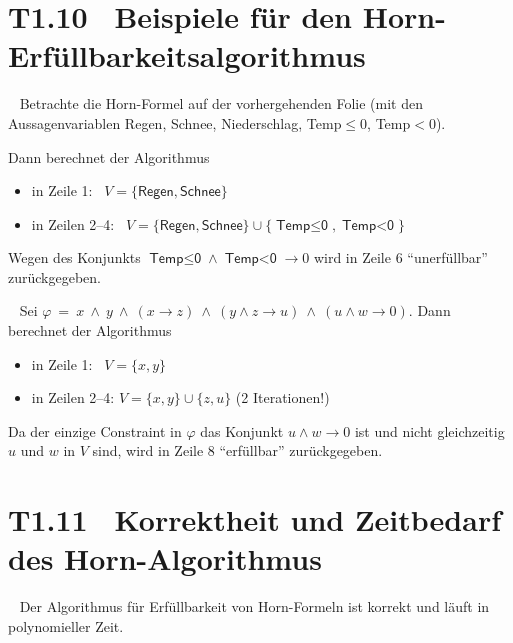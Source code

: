 \documentclass[fontsize=11pt, twoside=false, numbers=autoenddot]{scrbook}
\begin{document}
\section*{T1.10~ Beispiele für den Horn-Erfüllbarkeitsalgorithmus}

~
Betrachte die Horn-Formel auf der vorhergehenden Folie
(mit den Aussagenvariablen \textsf{Regen}, \textsf{Schnee}, \textsf{Niederschlag},
\textsf{Temp$\leq$0}, \textsf{Temp$<$0}).

Dann berechnet der Algorithmus
\begin{itemize}
  \item
    in Zeile 1:~ $V = \{\textsf{Regen},\textsf{Schnee}\}$
  \item
    in Zeilen 2--4:~ $V = \{\textsf{Regen},\textsf{Schnee}\} \cup \{\textsf{Temp$\leq$0}, \textsf{Temp$<$0}\}$
\end{itemize}
Wegen des Konjunkts $\textsf{Temp$\leq$0} \land \textsf{Temp$<$0} \to 0$
wird in Zeile 6 "`unerfüllbar"' zurückgegeben.

\par\medskip
{}~
Sei
$
  \varphi ~=~ x ~\land~ y ~\land~ (x \to z) ~\land~ (y \land z \to u) ~\land~ (u \land w \to 0).
$
Dann berechnet der Algorithmus
\begin{itemize}
  \item
    in Zeile 1:~ $V = \{x,y\}$
  \item
    in Zeilen 2--4: $V = \{x,y\} \cup \{z,u\}$ (2 Iterationen!)
\end{itemize}
Da der einzige Constraint in $\varphi$ das Konjunkt $u \land w \to 0$ ist
und nicht gleichzeitig $u$ und $w$ in $V$ sind,
wird in Zeile 8 "`erfüllbar"' zurückgegeben.


\section*{T1.11~ Korrektheit und Zeitbedarf des Horn-Algorithmus}

~
Der Algorithmus für Erfüllbarkeit von Horn-Formeln ist korrekt
und läuft in polynomieller Zeit.
\end{document}
